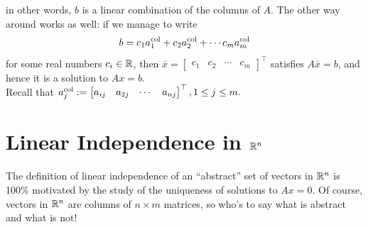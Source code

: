 \documentclass[letterpaper]{book}
\begin{document}
in other words, $b$ is a linear combination of the columns of $A$. The other way around works as well: if we manage to write 
$$b = c_1  a_1^{\rm col} + c_2 a_2^{\rm col} + \cdots c_m a_m^{\rm col}$$
for some real numbers $c_i \in \mathbb R$, then $\bar{x}=\begin{bmatrix} c_1 & c_2 & \cdots & c_m \end{bmatrix}^\top$ satisfies $A \bar{x}=b$, and hence it is a solution to $Ax=b$. \\

Recall that $a_j^{\rm col}:=\begin{bmatrix} a_{ij} & a_{2j}  & \cdots & a_{nj} \end{bmatrix}^\top, 1 \le j \le m.$


\section{Linear Independence in $\mathbb R^n$}

The definition of linear independence of an ``abstract'' set of vectors in $\mathbb R^n$ is 100\% motivated by the study of the uniqueness of solutions to $Ax=0.$ Of course, vectors in $\mathbb R^n$ are columns of $n \times m$ matrices, so who's to say what is abstract and what is not!

\vspace*{0.5cm}
\end{document}
